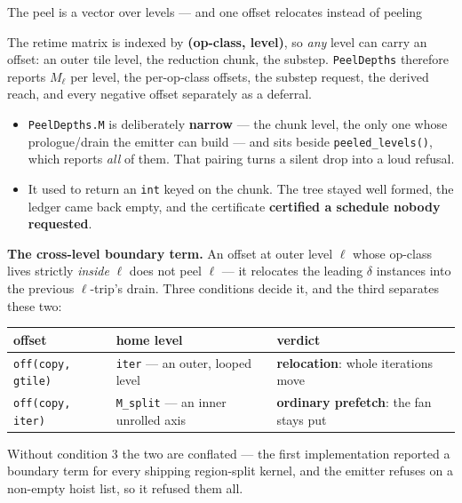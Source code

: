 \documentclass[aspectratio=169,9pt]{beamer}
\newcommand{\tsub}[1]{{\footnotesize\color{gray}#1}}
\newcommand{\key}[1]{\textcolor{acc}{\textbf{#1}}}
\newcommand{\bad}[1]{\textcolor{warn}{\textbf{#1}}}
\newcommand{\good}[1]{\textcolor{ok}{\textbf{#1}}}
\begin{document}
\begin{frame}{The peel is a vector over levels --- and one offset relocates instead of peeling}

The retime matrix is indexed by \key{(op-class, level)}, so \emph{any} level can carry an offset: an
outer tile level, the reduction chunk, the substep. \texttt{PeelDepths} therefore reports
$M_\ell$ per level, the per-op-class offsets, the substep request, the derived reach, and every
negative offset separately as a deferral.

\begin{itemize}
  \item \texttt{PeelDepths.M} is deliberately \key{narrow} --- the chunk level, the only one whose prologue/drain the emitter can build --- and sits beside \texttt{peeled\_levels()}, which reports \emph{all} of them. That pairing turns a silent drop into a loud refusal.
  \item It used to return an \texttt{int} keyed on the chunk. The tree stayed well formed, the ledger came back empty, and the certificate \bad{certified a schedule nobody requested}.
\end{itemize}

\textbf{The cross-level boundary term.} An offset at outer level $\ell$ whose op-class lives strictly
\emph{inside} $\ell$ does not peel $\ell$ --- it relocates the leading $\delta$ instances into the
previous $\ell$-trip's drain. Three conditions decide it, and the third separates these two:

\begin{center}\scriptsize
\begin{tabular}{lll}
\toprule
offset & home level & verdict \\
\midrule
\texttt{off(copy, gtile)} & \texttt{iter} --- an outer, looped level & \good{relocation}: whole iterations move \\
\texttt{off(copy, iter)}  & \texttt{M\_split} --- an inner unrolled axis & \bad{ordinary prefetch}: the fan stays put \\
\bottomrule
\end{tabular}
\end{center}

\tsub{Without condition 3 the two are conflated --- the first implementation reported a boundary term for every shipping region-split kernel, and the emitter refuses on a non-empty hoist list, so it refused them all.}
\end{frame}
\end{document}
